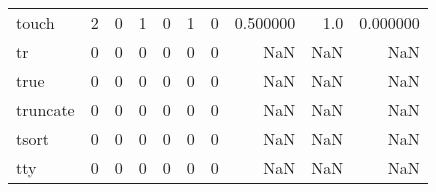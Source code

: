 \begin{tabular}{lrrrrrrrrr}
touch     &                                                  2 &                                                  0 &                                                  1 &                                                  0 &                                                  1 &                                                  0 &                                           0.500000 &                                    1.0 &                             0.000000 \\
tr        &                                                  0 &                                                  0 &                                                  0 &                                                  0 &                                                  0 &                                                  0 &                                                NaN &                                    NaN &                                  NaN \\
true      &                                                  0 &                                                  0 &                                                  0 &                                                  0 &                                                  0 &                                                  0 &                                                NaN &                                    NaN &                                  NaN \\
truncate  &                                                  0 &                                                  0 &                                                  0 &                                                  0 &                                                  0 &                                                  0 &                                                NaN &                                    NaN &                                  NaN \\
tsort     &                                                  0 &                                                  0 &                                                  0 &                                                  0 &                                                  0 &                                                  0 &                                                NaN &                                    NaN &                                  NaN \\
tty       &                                                  0 &                                                  0 &                                                  0 &                                                  0 &                                                  0 &                                                  0 &                                                NaN &                                    NaN &                                  NaN \\

\end{tabular}
